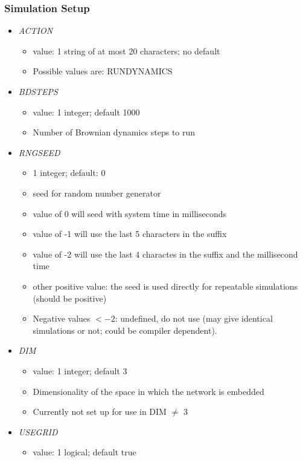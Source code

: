 \documentclass[12pt]{article}
\begin{document}
\subsubsection*{Simulation Setup}
\begin{itemize}
%
\item {\it ACTION}
  \begin{itemize}
    \item  value: 1 string of at most 20 characters; no default
    \item Possible values are: RUNDYNAMICS
  \end{itemize}
%
\item {\it BDSTEPS}
  \begin{itemize}
    \item  value: 1 integer; default 1000
    \item Number of Brownian dynamics steps to run
  \end{itemize}
%
\item {\it RNGSEED}
  \begin{itemize}
    \item 1 integer; default: $0$
    \item seed for random number generator
    \item value of 0 will seed with system time in milliseconds
    \item value of -1 will use the last 5 characters in the suffix
    \item value of -2 will use the last 4 charactes in the suffix and the millisecond time
    \item other positive value: the seed is used directly for repeatable simulations (should be positive)
    \item Negative values $< -2$: undefined, do not use (may give identical simulations or not; could be compiler dependent).
  \end{itemize}
%
\item {\it DIM}
  \begin{itemize}
    \item  value: 1 integer; default 3
    \item Dimensionality of the space in which the network is embedded
    \item Currently not set up for use in DIM $\ne$ 3
  \end{itemize}
%
\item {\it USEGRID}
  \begin{itemize}
    \item  value: 1 logical; default true

\end{itemize}
\end{itemize}
\end{document}
